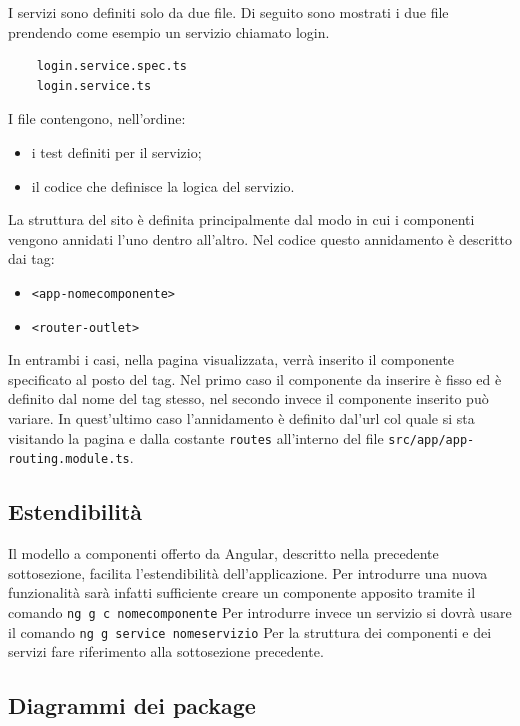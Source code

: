 I servizi sono definiti solo da due file. Di seguito sono mostrati i due file prendendo come esempio un servizio chiamato login. 
\begin{verbatim}
	login.service.spec.ts
	login.service.ts
\end{verbatim}
I file contengono, nell'ordine:
\begin{itemize}
	\item i test definiti per il servizio;
	\item il codice che definisce la logica del servizio.
\end{itemize}

La struttura del sito è definita principalmente dal modo in cui i componenti vengono annidati l'uno dentro all'altro. Nel codice  questo annidamento è descritto dai tag:
\begin{itemize}
	\item \texttt{<app-nomecomponente>}
	\item \texttt{<router-outlet>}
\end{itemize}
In entrambi i casi, nella pagina visualizzata, verrà inserito il componente specificato al posto del tag. Nel primo caso il componente da inserire è fisso ed è definito dal nome del tag stesso, nel secondo invece il componente inserito può variare. In quest'ultimo caso l'annidamento è definito dal'url col quale si sta visitando la pagina e dalla costante \texttt{routes} all'interno del file \texttt{src/app/app-routing.module.ts}.

\subsection{Estendibilità}
Il modello a componenti offerto da Angular, descritto nella precedente sottosezione, facilita l'estendibilità dell'applicazione. Per introdurre una nuova funzionalità sarà infatti sufficiente creare un componente apposito tramite il comando \newline
	\texttt{ng g c nomecomponente} \newline
Per introdurre invece un servizio si dovrà usare il comando \newline
	\texttt{ng g service nomeservizio} \newline
Per la struttura dei componenti e dei servizi fare riferimento alla sottosezione precedente.

\subsection{Diagrammi dei package}

